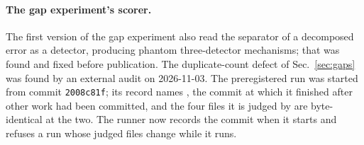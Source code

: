 \documentclass[aps,pra,twocolumn,superscriptaddress,nofootinbib,longbibliography,floatfix]{revtex4-2}
\begin{document}
\paragraph*{The gap experiment's scorer.} The first version of the gap experiment also read the separator of a decomposed error as a detector, producing phantom three-detector mechanisms; that was found and fixed before publication. The duplicate-count defect of Sec.~\ref{sec:gaps} was found by an external audit on 2026-11-03. The preregistered run was started from commit \texttt{2008c81f}; its record names \texttt{\GapRunCommit}, the commit at which it finished after other work had been committed, and the four files it is judged by are byte-identical at the two. The runner now records the commit when it starts and refuses a run whose judged files change while it runs.


\end{document}
